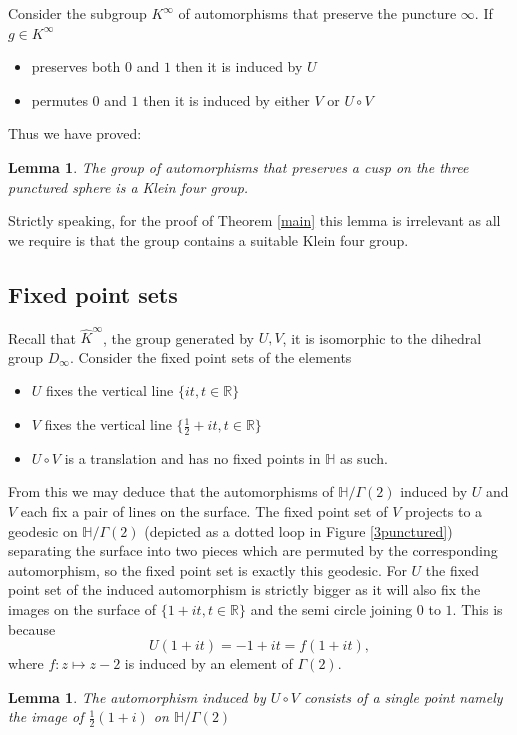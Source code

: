 \documentclass[12pt,a4paper]{amsart}
\newtheorem{lem}[thm]{Lemma}
\def\HH{\mathbb{H}}
\def\xx{\HH/g2}
\def\RR{\mathbb{R}}
\def\g2{\Gamma(2)}
\def\xx{\HH/\g2}
\begin{document}
Consider the subgroup $K^\infty$ of automorphisms that 
preserve the puncture $\infty$.
 If $g\in K^\infty$
\begin{itemize}
\item  preserves both  $0$ and $ 1$ then it is induced by $U$
\item  permutes  $0$ and $ 1$ then it is induced by either  $V$  or $U\circ V$
\end{itemize}

Thus we have proved:

\begin{lem}
The group of automorphisms that preserves a cusp 
on the three punctured sphere is a Klein four group.
\end{lem}

Strictly speaking, for the proof of Theorem \ref{main} this lemma is irrelevant 
as all we require is that the group contains a suitable Klein four group.


\subsection{Fixed point sets }

Recall that  $\hat{K}^\infty$,  the group generated by $U,V$,
it is isomorphic to the dihedral group $D_\infty$.
Consider the fixed point sets of the elements
\begin{itemize}
\item $U$ fixes the  vertical line $\{ it, t \in \RR \} $
\item $V$ fixes the vertical line $\{ \frac{1}{2} +  it , t \in \RR \} $
\item $U\circ V$  is a translation and has no fixed points in $\HH$ as such.
\end{itemize}
From this we may deduce that the automorphisms of $\xx$ induced by $U$ and $V$ 
each fix a pair of lines on the surface. 
The fixed point set of  $V$ projects 
to a geodesic on $\xx$ (depicted as a dotted loop in Figure \ref{3punctured})
separating the surface
 into  two pieces which are permuted by 
the corresponding automorphism,
so the fixed point set is exactly this geodesic.
For $U$ the fixed point set of the induced automorphism  is strictly bigger 
as it will also fix  the images on the surface of 
$\{1+  it, t \in \RR \} $ and the semi circle joining $0$ to $1$.
This is because 
$$U(1+  it) = - 1+  it = f(1+  it),$$
where $f: z \mapsto z - 2$ is induced by an element of $\g2$.


\begin{lem}
The automorphism induced by $U\circ V$ consists of a single point
namely the image of $\frac{1}{2 }(1+ i)$ on $\xx$
\end{lem}
\end{document}
